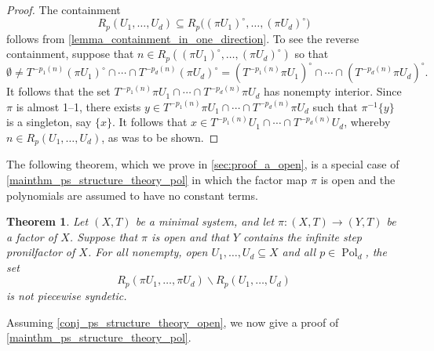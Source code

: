 \documentclass{article}
\theoremstyle{plain}
\newtheorem{theorem}[Theorem]{Theorem}
\theoremstyle{claim}
\theoremstyle{definition}
\theoremstyle{plain}
\theoremstyle{plain}
\newcommand{\Pol}{\operatorname{Pol}}
\renewcommand{\setminus}{\backslash}
\newcommand{\1}{\boldsymbol{1}}
\begin{document}
\begin{proof}
    The containment
    \[R_p(U_1,\ldots,U_d) \subseteq R_p\big((\pi U_1)^\circ, \ldots, (\pi U_d)^\circ\big)\]
    follows from \cref{lemma_containment_in_one_direction}. To see the reverse containment, suppose that $n \in R_p ( (\pi U_1)^\circ, \ldots, (\pi U_d)^\circ)$ so that
    \[\emptyset \neq T^{-p_1(n)} (\pi U_1)^\circ \cap \cdots \cap T^{-p_d(n)} (\pi U_d)^\circ = (T^{-p_1(n)} \pi U_1)^\circ \cap \cdots \cap (T^{-p_d(n)} \pi U_d)^\circ.\]
    It follows that the set $T^{-p_1(n)} \pi U_1 \cap \cdots \cap T^{-p_d(n)} \pi U_d$ has nonempty interior.  Since $\pi$ is almost 1--1, there exists  $y \in T^{-p_1(n)}\pi U_1 \cap \cdots \cap T^{-p_d(n)}\pi U_d$ such that $\pi^{-1}\{y\}$ is a singleton, say $\{x\}$.  It follows that $x \in T^{-p_1(n)}U_1 \cap \cdots \cap T^{-p_d(n)}U_d$, whereby $n \in R_p(U_1,\ldots,U_d)$, as was to be shown.
\end{proof}

The following theorem, which we prove in \cref{sec:proof_a_open}, is a special case of \cref{mainthm_ps_structure_theory_pol} in which the factor map $\pi$ is open and the polynomials are assumed to have no constant terms.

\begin{theorem}
\label{thm_ps_structure_theory_open}
\label{conj_ps_structure_theory_open}
    Let $(X,T)$ be a minimal system, and let $\pi: (X,T) \to (Y,T)$ be a factor of $X$. Suppose that $\pi$ is open and that $Y$ contains the infinite step pronilfactor of $X$. For all nonempty, open $U_1, \ldots, U_d \subseteq X$ and all $p \in \Pol_d$, the set
    \[
        R_p(\pi U_1, \ldots, \pi U_d) \setminus R_p(U_1, \ldots, U_d)
    \]
    is not piecewise syndetic.
\end{theorem}

Assuming \cref{conj_ps_structure_theory_open}, we now give a proof of \cref{mainthm_ps_structure_theory_pol}.
\end{document}
